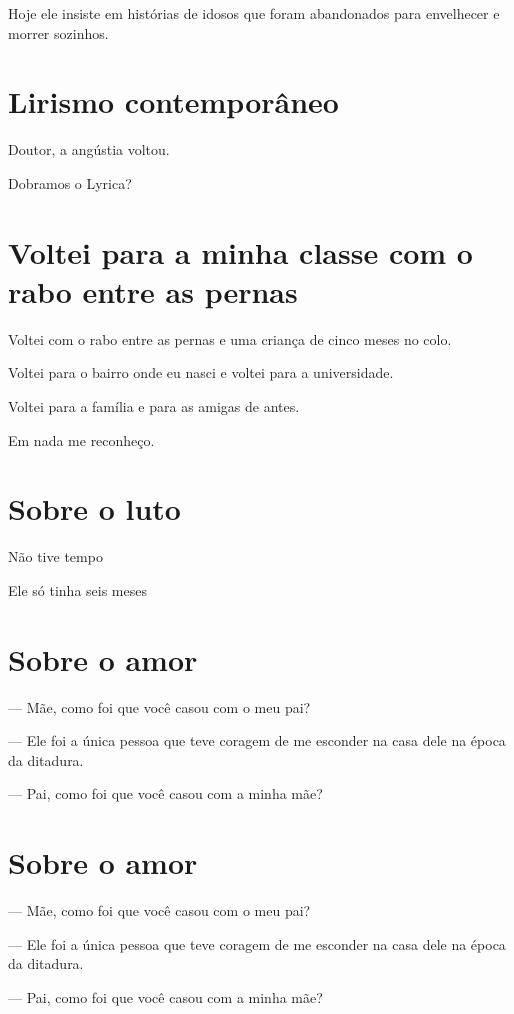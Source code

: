 {{Hoje ele insiste em histórias de idosos que foram abandonados para
envelhecer e morrer sozinhos.


\chapter{Lirismo contemporâneo}\label{lirismo-contemporuxe2neo}

{\noindent
Doutor, a angústia voltou.

Dobramos o Lyrica?}

\chapter{Voltei para a minha classe com o rabo entre as pernas}

Voltei com o rabo entre as pernas e uma criança de cinco meses no colo.

Voltei para o bairro onde eu nasci e voltei para a universidade.

Voltei para a família e para as amigas de antes.

Em nada me reconheço.

\chapter{Sobre o luto}

{\parindent0pt\parskip1pt
Não tive tempo

Ele só tinha seis meses
}

\chapter{Sobre o amor}

{\parindent0pt\parskip1pt
— Mãe, como foi que você casou com o meu pai?

— Ele foi a única pessoa que teve coragem de me esconder na casa dele na
época da ditadura.

— Pai, como foi que você casou com a minha mãe?

\chapter{Sobre o amor}\label{sobre-o-amor}

--- Mãe, como foi que você casou com o meu pai?

--- Ele foi a única pessoa que teve coragem de me esconder na casa dele
na época da ditadura.

--- Pai, como foi que você casou com a minha mãe?

}}}
